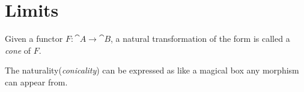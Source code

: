 
\section{Limits}

\begin{definition}[Cone]
Given a functor $F : \cat A \to \cat B$, a natural transformation of the form
is called a \emph{cone} of $F$.
\end{definition}
The naturality(\emph{conicality}) can be expressed as
like a magical box any morphism can appear from.


